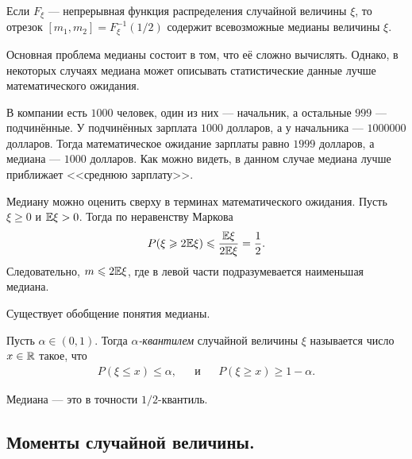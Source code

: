 \documentclass[../main.tex]{subfiles}
\begin{document}
\begin{remrk*}
 Если $ F_\xi $ --- непрерывная функция распределения случайной величины $ \xi $, то отрезок $ [m_1,m_2] = F_\xi^{-1}(1/2) $ содержит всевозможные медианы величины $ \xi $.
\end{remrk*}

Основная проблема медианы состоит в том, что её сложно вычислять. Однако, в некоторых случаях медиана может описывать статистические данные лучше математического ожидания.

\begin{exmpl*}
 В компании есть $ 1000 $ человек, один из них --- начальник, а остальные $ 999 $ --- подчинённые. У подчинённых зарплата $ 1000 $ долларов, а у начальника --- $ 1000000 $ долларов. Тогда математическое ожидание зарплаты равно $ 1999 $ долларов, а медиана --- $ 1000 $ долларов. Как можно видеть, в данном случае медиана лучше приближает <<среднюю зарплату>>.
\end{exmpl*}

\begin{remrk*}
 Медиану можно оценить сверху в терминах математического ожидания. Пусть $ \xi \geqslant 0 $ и $ \mathbb E\xi > 0 $. Тогда по неравенству Маркова
 \begin{align*}
  P(\xi \geqslant 2\mathbb E\xi) \leqslant \frac{\mathbb E\xi}{2\mathbb E\xi} = \frac{1}{2}.
 \end{align*} Следовательно, $ m \leqslant 2\mathbb E\xi $, где в левой части подразумевается наименьшая медиана.
\end{remrk*}

Существует обобщение понятия медианы.

\begin{df*}
 Пусть $ \alpha \in (0,1) $. Тогда \textit{$ \alpha $-квантилем} случайной величины $ \xi $ называется число $ x \in \mathbb{R} $ такое, что
 \begin{align*}
  P(\xi \leqslant x) \leqslant \alpha, &&\text{и} &&P(\xi \geqslant x) \geqslant 1 - \alpha.
 \end{align*}
\end{df*}

Медиана --- это в точности $ 1 / 2 $-квантиль.

\subsection{Моменты случайной величины.}
\end{document}
